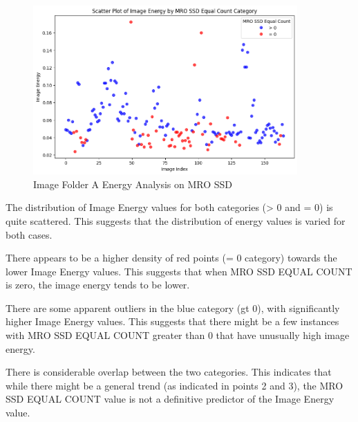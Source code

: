 \begin{figure}[ht]
    \centering
    \includegraphics[width=0.9\textwidth]{Figures/Results/sipa_02/energy.png}
    \caption[Image Folder A Energy Analysis on MRO SSD]{Image Folder A Energy Analysis on MRO SSD}
    \label{fig:Image Folder A Energy Analysis on MRO SSD}
\end{figure}




The distribution of Image Energy values for both categories (> 0 and = 0) is quite scattered. This suggests that the distribution of energy values is varied for both cases.

There appears to be a higher density of red points (= 0 category) towards the lower Image Energy values. This suggests that when MRO SSD EQUAL COUNT is zero, the image energy tends to be lower.

There are some apparent outliers in the blue category (gt 0), with significantly higher Image Energy values. This suggests that there might be a few instances with MRO SSD EQUAL COUNT greater than 0 that have unusually high image energy.

There is considerable overlap between the two categories. This indicates that while there might be a general trend (as indicated in points 2 and 3), the MRO SSD EQUAL COUNT value is not a definitive predictor of the Image Energy value.

\newpage

